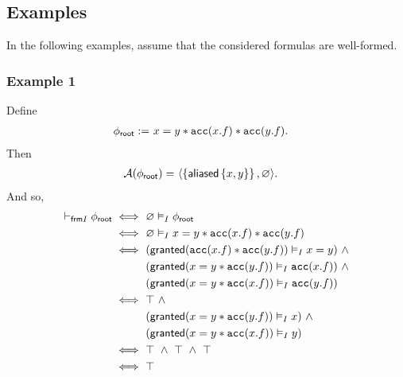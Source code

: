 \newpage
\subsection{Examples}

In the following examples, assume that the considered formulas are well-formed.

\subsubsection*{Example 1}

Define
\begin{align*}
{\phi_\textsf{root}} := & \ x = y \ast \texttt{acc}(x.f) \ast \texttt{acc}(y.f).
\end{align*}
Then
\begin{align*}
\mathcal{A}({\phi_\textsf{root}}) = & \ \langle  \left\{ \textsf{aliased}\left\{ x,y \right\} \right\} ,  \varnothing  \rangle.
\end{align*}
And so,
\begin{align*}
\vdash_{\textsf{frm}I} {\phi_\textsf{root}}
\iff & \
\varnothing \vDash_I {\phi_\textsf{root}}
\\ \iff & \
\varnothing \vDash_I x = y \ast \texttt{acc}(x.f) \ast \texttt{acc}(y.f)
\\ \iff & \
( \textsf{granted}(\texttt{acc}(x.f) \ast \texttt{acc}(y.f)) \vDash_I x = y ) \ \land \\ & \
( \textsf{granted}(x = y \ast \texttt{acc}(y.f)) \vDash_I \texttt{acc}(x.f) ) \ \land \\ & \
( \textsf{granted}(x = y \ast \texttt{acc}(x.f)) \vDash_I \texttt{acc}(y.f) )
\\ \iff & \
\top \ \land \\ & \
( \textsf{granted}(x = y \ast \texttt{acc}(y.f)) \vDash_I x ) \ \land \\ & \
( \textsf{granted}(x = y \ast \texttt{acc}(x.f)) \vDash_I y )
\\ \iff & \
\top \ \land \ \top \ \land \ \top
\\ \iff & \
\top
\end{align*}

